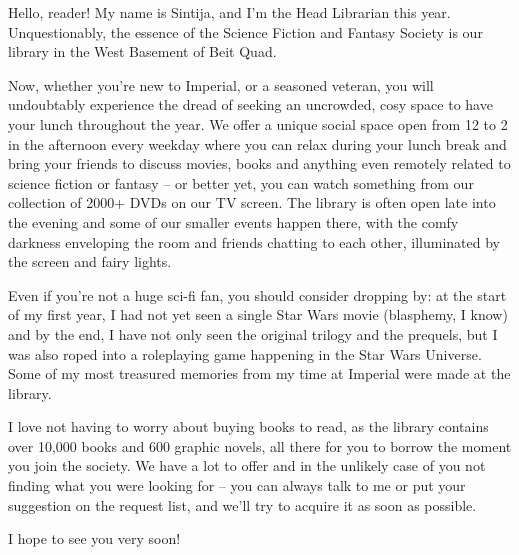 Hello, reader! My name is Sintija, and I’m the Head Librarian this
year. Unquestionably, the essence of the Science Fiction and Fantasy
Society is our library in the West Basement of Beit Quad.

Now, whether you’re new to Imperial, or a seasoned veteran, you will
undoubtably experience the dread of seeking an uncrowded, cosy space
to have your lunch throughout the year. We offer a unique social space
open from 12 to 2 in the afternoon every weekday where you can relax
during your lunch break and bring your friends to discuss movies,
books and anything even remotely related to science fiction or fantasy
– or better yet, you can watch something from our collection of 2000+
DVDs on our TV screen. The library is often open late into the evening
and some of our smaller events happen there, with the comfy darkness
enveloping the room and friends chatting to each other, illuminated by
the screen and fairy lights.

Even if you’re not a huge sci-fi fan, you should consider dropping by:
at the start of my first year, I had not yet seen a single Star Wars
movie (blasphemy, I know) and by the end, I have not only seen the
original trilogy and the prequels, but I was also roped into a
roleplaying game happening in the Star Wars Universe. Some of my most
treasured memories from my time at Imperial were made at the
library.

I love not having to worry about buying books to read, as the library
contains over 10,000 books and 600 graphic novels, all there for you
to borrow the moment you join the society.  We have a lot to offer and
in the unlikely case of you not finding what you were looking for –
you can always talk to me or put your suggestion on the request list,
and we’ll try to acquire it as soon as possible.

I hope to see you very soon!
